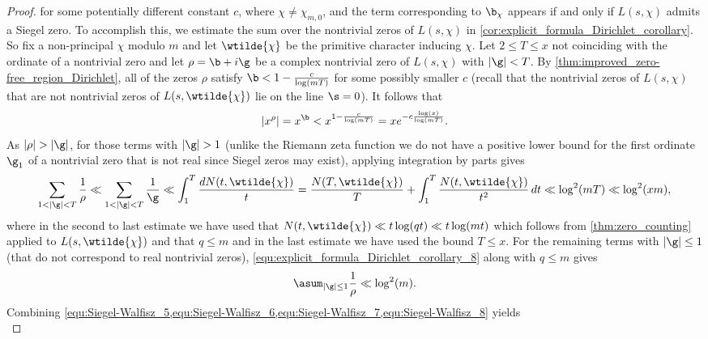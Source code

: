 \begin{proof}
      for some potentially different constant \(c\), where \(\chi \neq \chi_{m,0}\), and the term corresponding to \(\b_{\chi}\) appears if and only if \(L(s,\chi)\) admits a Siegel zero. To accomplish this, we estimate the sum over the nontrivial zeros of \(L(s,\chi)\) in \cref{cor:explicit_formula_Dirichlet_corollary}. So fix a non-principal \(\chi\) modulo \(m\) and let \(\wtilde{\chi}\) be the primitive character inducing \(\chi\). Let \(2 \le T \le x\) not coinciding with the ordinate of a nontrivial zero and let \(\rho = \b+i\g\) be a complex nontrivial zero of \(L(s,\chi)\) with \(|\g| < T\). By \cref{thm:improved_zero-free_region_Dirichlet}, all of the zeros \(\rho\) satisfy \(\b < 1-\frac{c}{\log(mT)}\) for some possibly smaller \(c\) (recall that the nontrivial zeros of \(L(s,\chi)\) that are not nontrivial zeros of \(L(s,\wtilde{\chi})\) lie on the line \(\s = 0\)). It follows that
      \begin{equation}\label{equ:Siegel-Walfisz_6}
        |x^{\rho}| = x^{\b} < x^{1-\frac{c}{\log(mT)}} = xe^{-c\frac{\log(x)}{\log(mT)}}.
      \end{equation}
      As \(|\rho| > |\g|\), for those terms with \(|\g| > 1\) (unlike the Riemann zeta function we do not have a positive lower bound for the first ordinate \(\g_{1}\) of a nontrivial zero that is not real since Siegel zeros may exist), applying integration by parts gives
      \begin{equation}\label{equ:Siegel-Walfisz_7}
        \sum_{1 < |\g| < T}\frac{1}{\rho} \ll \sum_{1 < |\g| < T}\frac{1}{\g} \ll \int_{1}^{T}\frac{dN(t,\wtilde{\chi})}{t} = \frac{N(T,\wtilde{\chi})}{T}+\int_{1}^{T}\frac{N(t,\wtilde{\chi})}{t^{2}}\,dt \ll \log^{2}(mT) \ll \log^{2}(xm),
      \end{equation}
      where in the second to last estimate we have used that \(N(t,\wtilde{\chi}) \ll t\log(qt) \ll t\log(mt)\) which follows from \cref{thm:zero_counting} applied to \(L(s,\wtilde{\chi})\) and that \(q \le m\) and in the last estimate we have used the bound \(T \le x\). For the remaining terms with \(|\g| \le 1\) (that do not correspond to real nontrivial zeros), \cref{equ:explicit_formula_Dirichlet_corollary_8} along with \(q \le m\) gives
      \begin{equation}\label{equ:Siegel-Walfisz_8}
        \asum_{|\g| \le 1}\frac{1}{\rho} \ll \log^{2}(m).
      \end{equation}
      Combining \cref{equ:Siegel-Walfisz_5,equ:Siegel-Walfisz_6,equ:Siegel-Walfisz_7,equ:Siegel-Walfisz_8} yields
      \begin{equation}\label{equ:Siegel-Walfisz_9}

\end{equation}
\end{proof}
